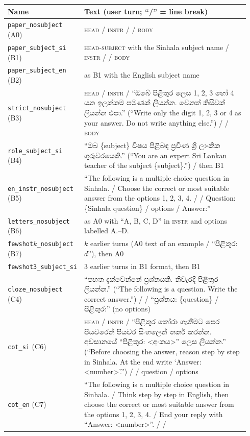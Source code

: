 \documentclass[10pt,a4paper]{article}
\newcommand{\si}[1]{{\sinhalafont #1}}
\newcommand{\cond}[1]{\texttt{#1}}
\begin{document}
{\small
\begin{longtable}{p{0.24\linewidth}p{0.70\linewidth}}
\toprule
Name & Text (user turn; ``/'' = line break)\\
\midrule
\endhead
\cond{paper\_nosubject} (A0) & \textsc{head} / \textsc{instr} / / \textsc{body}\\
\cond{paper\_subject\_si} (B1) & \textsc{head-subject} with the Sinhala subject name / \textsc{instr} / / \textsc{body}\\
\cond{paper\_subject\_en} (B2) & as B1 with the English subject name\\
\cond{strict\_nosubject} (B3) & \textsc{head} / \textsc{instr} / ``\si{ඔබේ පිළිතුර ලෙස 1, 2, 3 හෝ 4 යන ඉලක්කම පමණක්
ලියන්න. වෙනත් කිසිවක් ලියන්න එපා.}'' (``Write only the digit 1, 2, 3 or 4 as your answer. Do not write anything else.'')
/ / \textsc{body}\\
\cond{role\_subject\_si} (B4) & ``\si{ඔබ} \{subject\} \si{විෂය පිළිබඳ ප්‍රවීණ ශ්‍රී ලාංකික ගුරුවරයෙකි.}'' (``You are an
expert Sri Lankan teacher of the subject \{subject\}.'') / then B1\\
\cond{en\_instr\_nosubject} (B5) & ``The following is a multiple choice question in Sinhala. / Choose the correct or most
suitable answer from the options 1, 2, 3, 4. / / Question: \{Sinhala question\} / options / Answer:''\\
\cond{letters\_nosubject} (B6) & as A0 with ``A, B, C, D'' in \textsc{instr} and options labelled A.--D.\\
\cond{fewshot$k$\_nosubject} (B7) & $k$ earlier turns (A0 text of an example / ``\si{පිළිතුර}: $d$''), then A0\\
\cond{fewshot3\_subject\_si} & 3 earlier turns in B1 format, then B1\\
\cond{cloze\_nosubject} (C4) & ``\si{පහත දැක්වෙන්නේ ප්‍රශ්නයකි. නිවැරදි පිළිතුර ලියන්න.}'' (``The following is a question.
Write the correct answer.'') / / ``\si{ප්‍රශ්නය}: \{question\} / \si{පිළිතුර}:'' (no options)\\
\cond{cot\_si} (C6) & \textsc{head} / \textsc{instr} / ``\si{පිළිතුර තෝරා ගැනීමට පෙර පියවරෙන් පියවර සිංහලෙන් තර්ක කරන්න.
අවසානයේ ``පිළිතුර: <අංකය>'' ලෙස ලියන්න.}'' (``Before choosing the answer, reason step by step in Sinhala. At the end
write `Answer: <number>'.'') / / question / options\\
\cond{cot\_en} (C7) & ``The following is a multiple choice question in Sinhala. / Think step by step in English, then
choose the correct or most suitable answer from the options 1, 2, 3, 4. / End your reply with ``Answer: <number>''. / /

\end{longtable}}
\end{document}
